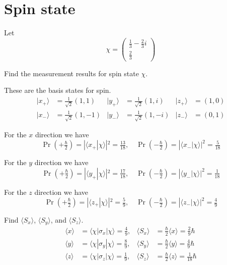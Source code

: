 

\section*{Spin state}

Let
\begin{equation*}
\chi=\begin{pmatrix}\frac{1}{3}-\frac{2}{3}i\\[1ex]\frac{2}{3}\end{pmatrix}
\end{equation*}

Find the measurement results for spin state $\chi$.

\bigskip
These are the basis states for spin.
\begin{align*}
|x_+\rangle&=\tfrac{1}{\sqrt2}(1,1) &
|y_+\rangle&=\tfrac{1}{\sqrt2}(1,i) &
|z_+\rangle&=(1,0)
\\
|x_-\rangle&=\tfrac{1}{\sqrt2}(1,-1) &
|y_-\rangle&=\tfrac{1}{\sqrt2}(1,-i) &
|z_-\rangle&=(0,1)
\end{align*}

For the $x$ direction we have
\begin{equation*}
\Pr\left(+\tfrac{\hbar}{2}\right)=|\langle x_+|\chi\rangle|^2=\tfrac{13}{18},\quad
\Pr\left(-\tfrac{\hbar}{2}\right)=|\langle x_-|\chi\rangle|^2=\tfrac{5}{18}
\end{equation*}

For the $y$ direction we have
\begin{equation*}
\Pr\left(+\tfrac{\hbar}{2}\right)=|\langle y_+|\chi\rangle|^2=\tfrac{17}{18},\quad
\Pr\left(-\tfrac{\hbar}{2}\right)=|\langle y_-|\chi\rangle|^2=\tfrac{1}{18}
\end{equation*}

For the $z$ direction we have
\begin{equation*}
\Pr\left(+\tfrac{\hbar}{2}\right)=|\langle z_+|\chi\rangle|^2=\tfrac{5}{9},\quad
\Pr\left(-\tfrac{\hbar}{2}\right)=|\langle z_-|\chi\rangle|^2=\tfrac{4}{9}
\end{equation*}

Find $\langle S_x\rangle$, $\langle S_y\rangle$, and $\langle S_z\rangle$.
\begin{align*}
\langle x\rangle&=\langle\chi|\sigma_x|\chi\rangle=\tfrac{4}{9}, &
\langle S_x\rangle&=\tfrac{\hbar}{2}\langle x\rangle=\tfrac{2}{9}\hbar
\\[1ex]
\langle y\rangle&=\langle\chi|\sigma_y|\chi\rangle=\tfrac{8}{9}, &
\langle S_y\rangle&=\tfrac{\hbar}{2}\langle y\rangle=\tfrac{4}{9}\hbar
\\[1ex]
\langle z\rangle&=\langle\chi|\sigma_z|\chi\rangle=\tfrac{1}{9}, &
\langle S_z\rangle&=\tfrac{\hbar}{2}\langle z\rangle=\tfrac{1}{18}\hbar
\end{align*}


